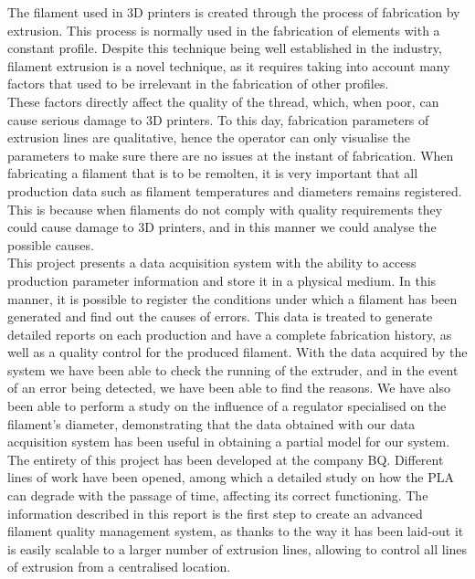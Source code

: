 The filament used in 3D printers is created through the process of fabrication by extrusion. This process is normally used in the fabrication of elements with a constant profile. Despite this technique being well established in the industry, filament extrusion is a novel technique, as it requires taking into account many factors that used to be irrelevant in the fabrication of other profiles.\\

These factors directly affect the quality of the thread, which, when poor, can cause serious damage to 3D printers. To this day, fabrication parameters of extrusion lines are qualitative, hence the operator can only visualise the parameters to make sure there are no issues at the instant of fabrication. When fabricating a filament that is to be remolten, it is very important that all production data such as filament temperatures and diameters remains registered. This is because when filaments do not comply with quality requirements they could cause damage to 3D printers, and in this manner we could analyse the possible causes.\\

This project presents a data acquisition system with the ability to access production parameter information and store it in a physical medium. In this manner, it is possible to register the conditions under which a filament has been generated and find out the causes of errors. This data is treated to generate detailed reports on each production and have a complete fabrication history, as well as a quality control for the produced filament. With the data acquired by the system we have been able to check the running of the extruder, and in the event of an error being detected, we have been able to find the reasons. We have also been able to perform a study on the influence of a regulator specialised on the filament’s diameter, demonstrating that the data obtained with our data acquisition system has been useful in obtaining a partial model for our system.\\

The entirety of this project has been developed at the company BQ. Different lines of work have been opened, among which a detailed study on how the PLA can degrade with the passage of time, affecting its correct functioning. The information described in this report is the first step to create an advanced filament quality management system, as thanks to the way it has been laid-out it is easily scalable to a larger number of extrusion lines, allowing to control all lines of extrusion from a centralised location. \\
